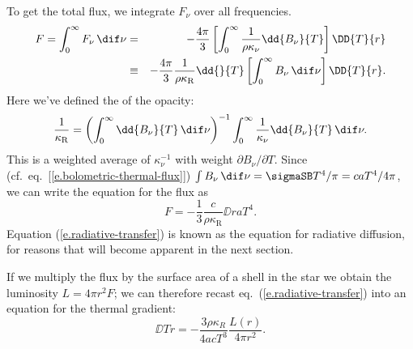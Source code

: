 To get the total flux, we integrate $F_{\nu}$ over all frequencies. 
\begin{eqnarray*}
	F = \int_{0}^{\infty}F_{\nu}\,\dif\nu &=& -\frac{4\pi}{3} \left[\int_{0}^{\infty} \frac{1}{\rho\kappa_{\nu}}\dd{B_{\nu}}{T}\right]\DD{T}{r}\\
	&\equiv& -\frac{4\pi}{3}\frac{1}{\rho\kappa_{\mathrm{R}}}\dd{}{T}\left[\int_{0}^{\infty}B_{\nu}\,\dif\nu\right]\DD{T}{r}.
\end{eqnarray*}
Here we've defined the  of the opacity:
\begin{equation}\label{e.rosseland-opacity}
	\frac{1}{\kappa_{\mathrm{R}}} = \left(\int_{0}^{\infty} \dd{B_{\nu}}{T}\,\dif\nu\right)^{-1}\int_{0}^{\infty} \frac{1}{\kappa_{\nu}}\dd{B_{\nu}}{T}\,\dif\nu.
\end{equation}
This is a weighted average of $\kappa_{\nu}^{-1}$ with weight $\partial B_{\nu}/\partial T$. Since (cf.\ eq.~[\ref{e.bolometric-thermal-flux}]) $\int B_{\nu}\,\dif\nu = \sigmaSB T^{4}/\pi = c a T^{4}/4\pi$, we can write the equation for the flux as
\begin{equation}
	F = -\frac{1}{3}\frac{c}{\rho\kappa_{\mathrm{R}}}\DD{}{r}aT^{4}.
\label{e.radiative-transfer}
\end{equation}
Equation (\ref{e.radiative-transfer}) is known as the equation for radiative diffusion, for reasons that will become apparent in the next section.

If we multiply the flux by the surface area of a shell in the star we obtain the luminosity $L = 4\pi r^{2} F$; we can therefore recast eq.~(\ref{e.radiative-transfer}) into an equation for the thermal gradient:
\begin{equation}
    \label{e.gradient-temperature}
    \DD{T}{r} = -\frac{3\rho\kappa_{R}}{4acT^3}\frac{L(r)}{4\pi r^2}.
\end{equation}

